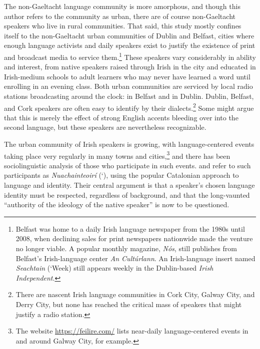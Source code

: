 \documentclass[output=paper,colorlinks,citecolor=brown]{langscibook}
\begin{document}
The non-Gaeltacht language community is more amorphous, and though this author refers to the community as urban, there are of course non-Gael\-tacht speakers who live in rural communities. That said, this study mostly confines itself to the non-Gaeltacht urban communities of Dublin and Belfast, cities where enough language activists and daily speakers exist to justify the existence of print and broadcast media to service them.\footnote{Belfast was home to a daily Irish language newspaper from the 1980s until 2008, when declining sales for print newspapers nationwide made the venture no longer viable. A popular monthly magazine, \textit{Nós}, still publishes from Belfast's Irish-language center \textit{An Cultúrlann}. An Irish-language insert named \textit{Seachtain} (`Week) still appears weekly in the Dublin-based \textit{Irish Independent}.} These speakers vary considerably in ability and interest, from native speakers raised through Irish in the city and educated in Irish-medium schools to adult learners who may never have learned a word until enrolling in an evening class. Both urban communities are serviced by local radio stations broadcasting around the clock:  in Belfast and  in Dublin. Dublin, Belfast, and Cork speakers are often easy to identify by their dialects.\footnote{There are nascent Irish language communities in Cork City, Galway City, and Derry City, but none has reached the critical mass of speakers that might justify a radio station.} Some might argue that this is merely the effect of strong English accents bleeding over into the second language, but these speakers are nevertheless recognizable. 

The urban community of Irish speakers is growing, with language-centered events taking place very regularly in many towns and cities,\footnote{The website \url{https://feilire.com/} lists near-daily language-centered events in and around Galway City, for example.} and there has been sociolinguistic analysis of those who participate in such events. \citet{ob:WalshORourke2015} and \cite{ob:ORourkeWalsh2020} refer to such participants as \textit{Nua\-chainteoirí} (`), using the popular Catalonian \textit{} approach to language and identity. Their central argument is that a speaker's chosen language identity must be respected, regardless of background, and that the long-vaunted “authority of the ideology of the native speaker” is now to be questioned. 
\end{document}
